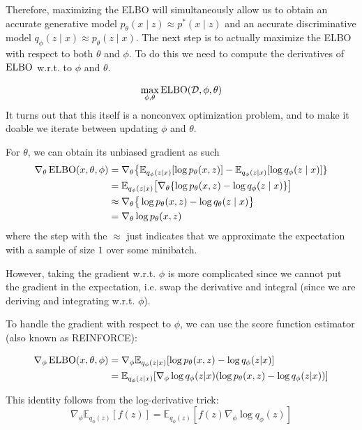   Therefore, maximizing the ELBO will simultaneously allow us to obtain an accurate generative model $p_\theta (x \mid z) \approx p^\ast (x \mid z)$ and an accurate discriminative model $q_\phi (z \mid x) \approx p_\theta (z \mid x)$. The next step is to actually maximize the ELBO with respect to both $\theta$ and $\phi$. To do this we need to compute the derivatives of $\elbo$ w.r.t. to $\phi$ and $\theta$. 

  \begin{equation}
    \max_{\phi, \theta} \elbo(\mathcal{D}, \phi, \theta)
  \end{equation}
  It turns out that this itself is a nonconvex optimization problem, and to make it doable we iterate between updating $\phi$ and $\theta$. 

  \begin{lemma}
    For $\theta$, we can obtain its unbiased gradient as such
    \begin{align} 
      \nabla_\theta \elbo(x, \theta, \phi) & = \nabla_\theta \big\{ \mathbb{E}_{q_\phi (z \mid x)} [ \log p_\theta (x, z)] - \mathbb{E}_{q_\phi (z \mid x)} [\log q_{\phi} (z \mid x)] \} \\
                                           & = \mathbb{E}_{q_\phi (z \mid x)} \big[ \nabla_\theta \{ \log p_\theta (x, z) - \log q_{\phi} (z \mid x) \}  \big] \\
                                           & \approx \nabla_\theta \big\{ \log p_\theta(x, z) - \log q_\theta (z \mid x) \big\} \\
                                           & = \nabla_\theta \log p_\theta (x, z) 
    \end{align}
    where the step with the $\approx$ just indicates that we approximate the expectation with a sample of size $1$ over some minibatch. 
  \end{lemma}

  However, taking the gradient w.r.t. $\phi$ is more complicated since we cannot put the gradient in the expectation, i.e. swap the derivative and integral (since we are deriving and integrating w.r.t. $\phi$). 

  \begin{lemma}
    To handle the gradient with respect to $\phi$, we can use the score function estimator (also known as REINFORCE):

    \begin{align}
      \nabla_\phi \elbo(x, \theta, \phi) &= \nabla_\phi \mathbb{E}_{q_\phi(z|x)}[\log p_\theta(x,z) - \log q_\phi(z|x)] \\
      &= \mathbb{E}_{q_\phi(z|x)}[\nabla_\phi \log q_\phi(z|x)(\log p_\theta(x,z) - \log q_\phi(z|x))]
    \end{align}

    This identity follows from the log-derivative trick:
    \begin{equation}
      \nabla_\phi \mathbb{E}_{q_\phi(z)}[f(z)] = \mathbb{E}_{q_\phi(z)}[f(z)\nabla_\phi \log q_\phi(z)]
    \end{equation}
  \end{lemma}

